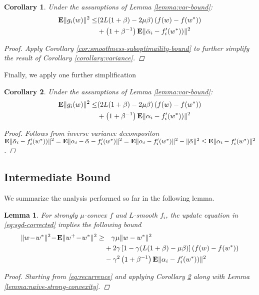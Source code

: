 \documentclass{article}
\newtheorem{lemma}{Lemma}
\newtheorem{corollary}{Corollary}
\newcommand{\E}{{\bf E}}
\begin{document}
\begin{corollary}
Under the assumptions of Lemma \ref{lemma:var-bound}:
\begin{align}
\E \|g_i(w)\|^2 \le & (2L (1+\beta)  - 2 \mu \beta) \left( f(w) - f(w^*) \right) \nonumber \\
& + \left(1+ \beta^{-1} \right) \E \| \bar \alpha_i - f_i'(w^*) )\|^2 
\end{align}
\begin{proof}
Apply Corollary \ref{cor:smoothness-suboptimaility-bound} to further simplify the result of Corollary \ref{corollary:variance}.
\end{proof} 
\label{eq:corollary3}
\end{corollary}
%
Finally, we apply one further simplification 
\begin{corollary}
Under the assumptions of Lemma \ref{lemma:var-bound}:
\begin{align}
\E \|g_i(w)\|^2 \le & (2L (1+\beta)  - 2 \mu \beta) \left( f(w) - f(w^*) \right) \nonumber \\
& + \left(1+ \beta^{-1} \right) \E \| \alpha_i - f_i'(w^*) )\|^2 
\end{align}
\begin{proof}
Follows from inverse variance decompositon $\E \| \bar \alpha_i - f_i'(w^*) )\|^2  = \E \| \alpha_i - \bar \alpha - f_i'(w^*) \|^2 =
\E \| \alpha_i - f_i'(w^*) \|^2 - \| \bar \alpha\|^2 \le \E \| \alpha_i - f_i'(w^*) \|^2$.
\end{proof} 
\label{corollary:final-bound}
\end{corollary}

\subsection{Intermediate Bound} 

We summarize the analysis performed so far in the following lemma.
\begin{lemma}
For strongly $\mu$-convex $f$ and $L$-smooth $f_i$, the update equation in \eqref{eq:sgd-corrected} implies the following bound 
\begin{align}
\| w \!-\! w^*\|^2 \!-\!  \E \| w^+ \!-\! w^*\|^2  \ge  &\quad \gamma \mu \| w- w^*\|^2 \\ 
& + 2\gamma \left[ 1 - \gamma  (L (1+\beta)  - \mu \beta) \right] (f(w) - f(w^*)) \nonumber \\
& - \gamma^2 \left(1+ \beta^{-1} \right) \E \| \alpha_i - f_i'(w^*) )\|^2 
\nonumber
\end{align}
\begin{proof}  
Starting from \eqref{eq:recurrence} and applying Corollary \ref{corollary:final-bound} along with  Lemma \ref{lemma:naive-strong-convexity}.
\end{proof}
\label{lemma:intermediate}
\end{lemma}
\end{document}
